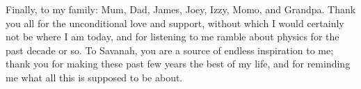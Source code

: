 Finally, to my family: Mum, Dad, James, Joey, Izzy, Momo, and Grandpa. Thank you all for the unconditional love and support, without which I would certainly not be where I am today, and for listening to me ramble about physics for the past decade or so. To Savanah, you are a source of endless inspiration to me; thank you for making these past few years the best of my life, and for reminding me what all this is supposed to be about.

